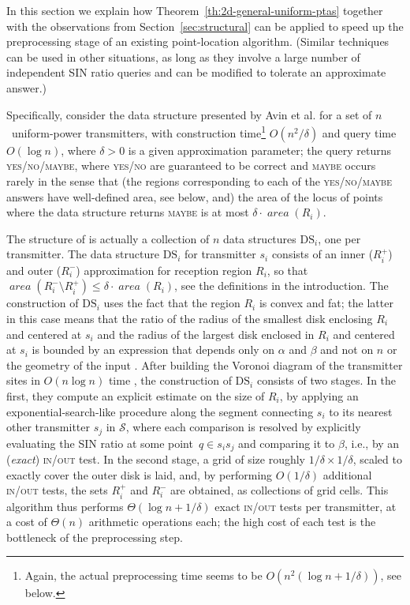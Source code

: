 \documentclass[11pt]{article}
\theoremstyle{remark}
\DeclareMathOperator{\area}{\mathit{area}}
\def\S{\mathcal{S}}
\begin{document}
In this section we explain how Theorem~\ref{th:2d-general-uniform-ptas} together with the observations from Section~\ref{sec:structural} can be applied to speed up the preprocessing stage of an existing point-location algorithm.  (Similar techniques can be used 
in other situations, as long as they involve a large number of independent SIN ratio queries and can be modified to tolerate an approximate answer.)



Specifically, consider the data structure presented by Avin et al. \cite{aeklpr-sdciawn-12} for a set of $n$~uniform-power transmitters, with construction time\footnote{Again, the actual preprocessing time seems to be $O(n^2(\log n + 1/\delta))$, see below.}
$O(n^2/\delta)$ and query time $O(\log n)$, where $\delta>0$ is a given approximation parameter; the query returns \textsc{yes/no/maybe}, where \textsc{yes/no} are guaranteed to be correct and \textsc{maybe} occurs rarely in the sense that (the regions corresponding to each of the \textsc{yes/no/maybe} answers have well-defined area, see below, and) the area of the locus of points where the data structure returns \textsc{maybe} is at most $\delta \cdot \area(R_i)$.

The structure of \cite{aeklpr-sdciawn-12} is actually a collection of $n$ data structures $\mbox{DS}_i$, one per transmitter.
The data structure $\mbox{DS}_i$ for transmitter $s_i$ consists of an inner ($R_i^+$) and outer ($R_i^-$) approximation for reception region $R_i$, so that $\area(R_i^- \setminus R_i^+) \le \delta \cdot \area(R_i)$, see the definitions in the introduction.  
The construction of $\mbox{DS}_i$ uses the fact that 
the region $R_i$ is convex and fat; the latter in this case means that the ratio of the radius of the smallest disk enclosing $R_i$ and centered at $s_i$ and the radius of the largest disk enclosed in $R_i$ and centered at $s_i$ is  bounded by an expression that depends only on $\alpha$ and $\beta$ and not on $n$ or the geometry of the input \cite{aeklpr-sdciawn-12}.
After building the Voronoi diagram of the transmitter sites in $O(n \log n)$ time \cite{bcko-cgaa-08},
the construction of $\mbox{DS}_i$ consists of two stages. In the first,
they compute an explicit estimate on the size of $R_i$, by applying an exponential-search-like procedure along the segment connecting $s_i$ to its nearest other transmitter $s_j$ in $\S$, where
each comparison is resolved by explicitly evaluating the SIN ratio at some point~$q \in s_is_j$ and comparing it to $\beta$, i.e., by an (\emph{exact}) \textsc{in/out} test. In the second stage, a grid of size roughly $1/\delta \times 1/\delta$, scaled to exactly cover the outer disk is laid, and, by performing $O(1/\delta)$ additional \textsc{in/out} tests, the sets $R_i^+$ and $R_i^-$ are obtained, as collections of grid cells.
This algorithm thus performs $\Theta(\log n + 1/\delta)$ exact \textsc{in/out} tests per transmitter, at a cost of $\Theta(n)$ arithmetic operations each; the high cost of each test is the bottleneck of the preprocessing step.
\end{document}
